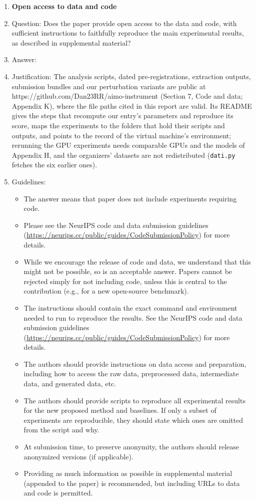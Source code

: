 \begin{enumerate}
\item {\bf Open access to data and code}
    \item[] Question: Does the paper provide open access to the data and code, with sufficient instructions to faithfully reproduce the main experimental results, as described in supplemental material?
    \item[] Answer: \answerYes{}
    \item[] Justification: The analysis scripts, dated pre-registrations, extraction outputs, submission bundles and our perturbation variants are public at https://github.com/Dan23RR/aimo-instrument (Section 7, Code and data; Appendix K), where the file paths cited in this report are valid. Its README gives the steps that recompute our entry's parameters and reproduce its score, maps the experiments to the folders that hold their scripts and outputs, and points to the record of the virtual machine's environment; rerunning the GPU experiments needs comparable GPUs and the models of Appendix H, and the organizers' datasets are not redistributed (\texttt{dati.py} fetches the six earlier ones).
    \item[] Guidelines:
    \begin{itemize}
        \item The answer \answerNA{} means that paper does not include experiments requiring code.
        \item Please see the NeurIPS code and data submission guidelines (\url{https://neurips.cc/public/guides/CodeSubmissionPolicy}) for more details.
        \item While we encourage the release of code and data, we understand that this might not be possible, so \answerNo{} is an acceptable answer. Papers cannot be rejected simply for not including code, unless this is central to the contribution (e.g., for a new open-source benchmark).
        \item The instructions should contain the exact command and environment needed to run to reproduce the results. See the NeurIPS code and data submission guidelines (\url{https://neurips.cc/public/guides/CodeSubmissionPolicy}) for more details.
        \item The authors should provide instructions on data access and preparation, including how to access the raw data, preprocessed data, intermediate data, and generated data, etc.
        \item The authors should provide scripts to reproduce all experimental results for the new proposed method and baselines. If only a subset of experiments are reproducible, they should state which ones are omitted from the script and why.
        \item At submission time, to preserve anonymity, the authors should release anonymized versions (if applicable).
        \item Providing as much information as possible in supplemental material (appended to the paper) is recommended, but including URLs to data and code is permitted.
    \end{itemize}



\end{enumerate}
